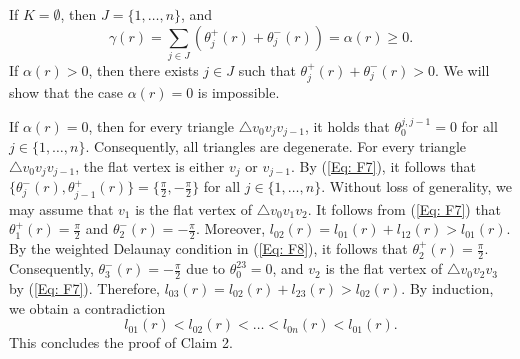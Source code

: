 \documentclass[12pt]{amsart}
\theoremstyle{definition}
\begin{document}
If $K=\emptyset$, then $J=\{1,\dots,n\}$, and
\begin{equation*}
\gamma(r)=\sum_{j\in{J}}(\theta_j^+(r)+\theta_j^-(r))
=\alpha(r)\ge0.
\end{equation*}
If $\alpha(r)>0$, then there exists $j\in J$ such that $\theta_j^+(r)+\theta_j^-(r)>0$. 
We will show that the case $\alpha(r)=0$ is impossible.

If $\alpha(r)=0$, then for every triangle $\triangle v_0v_jv_{j-1}$, it holds that $\theta_0^{j,j-1}=0$ for all $j\in \{1,\dots,n\}$. 
Consequently, all triangles are degenerate. 
For every triangle $\triangle v_0v_jv_{j-1}$, the flat vertex is either $v_j$ or $v_{j-1}$. 
By (\ref{Eq: F7}), it follows that $\{\theta_j^-(r),\theta_{j-1}^+(r)\}=\{\frac{\pi}{2}, -\frac{\pi}{2}\}$ for all $j\in \{1, \dots, n\}$. 
Without loss of generality, we may assume that $v_1$ is the flat vertex of $\triangle v_0v_1v_2$. 
It follows from (\ref{Eq: F7}) that $\theta_1^+(r)=\frac{\pi}{2}$ and $\theta_2^-(r)=-\frac{\pi}{2}$.
Moreover, $l_{02}(r)=l_{01}(r)+l_{12}(r)>l_{01}(r)$.
By the weighted Delaunay condition in (\ref{Eq: F8}), it follows that $\theta_2^+(r)=\frac{\pi}{2}$.
Consequently, $\theta_3^-(r)=-\frac{\pi}{2}$ due to $\theta_0^{23}=0$, and $v_2$ is the flat vertex of $\triangle v_0v_2v_3$ by (\ref{Eq: F7}). 
Therefore, $l_{03}(r)=l_{02}(r)+l_{23}(r)>l_{02}(r)$. By induction, we obtain a contradiction
\begin{equation*}
l_{01}(r)<l_{02}(r)<\dots<l_{0n}(r)<l_{01}(r).
\end{equation*}
This concludes the proof of Claim 2.

\end{document}
